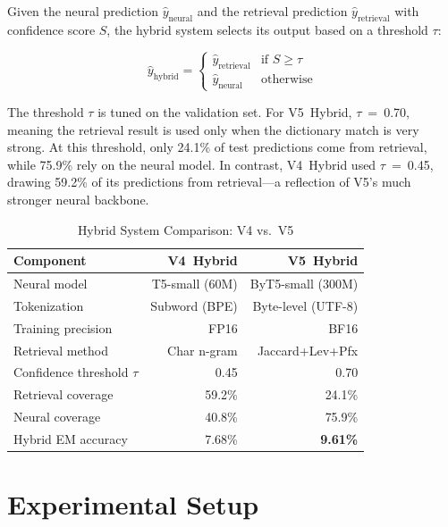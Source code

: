 \documentclass[conference]{IEEEtran}
\begin{document}
Given the neural prediction $\hat{y}_\text{neural}$ and the retrieval prediction $\hat{y}_\text{retrieval}$ with confidence score $S$, the hybrid system selects its output based on a threshold $\tau$:

\begin{equation}
\hat{y}_\text{hybrid} = \begin{cases}
\hat{y}_\text{retrieval} & \text{if } S \geq \tau \\
\hat{y}_\text{neural} & \text{otherwise}
\end{cases}
\end{equation}

The threshold $\tau$ is tuned on the validation set. For V5~Hybrid, $\tau$~=~0.70, meaning the retrieval result is used only when the dictionary match is very strong. At this threshold, only 24.1\% of test predictions come from retrieval, while 75.9\% rely on the neural model. In contrast, V4~Hybrid used $\tau$~=~0.45, drawing 59.2\% of its predictions from retrieval---a reflection of V5's much stronger neural backbone.


\begin{table}[htbp]
\centering
\caption{Hybrid System Comparison: V4 vs.\ V5}
\label{tab:hybrid}
\begin{tabular}{lrr}
\toprule
\textbf{Component} & \textbf{V4~Hybrid} & \textbf{V5~Hybrid} \\
\midrule
Neural model & T5-small (60M) & ByT5-small (300M) \\
Tokenization & Subword (BPE) & Byte-level (UTF-8) \\
Training precision & FP16 & BF16 \\
Retrieval method & Char n-gram & Jaccard+Lev+Pfx \\
Confidence threshold $\tau$ & 0.45 & 0.70 \\
Retrieval coverage & 59.2\% & 24.1\% \\
Neural coverage & 40.8\% & 75.9\% \\
\midrule
Hybrid EM accuracy & 7.68\% & \textbf{9.61\%} \\
\bottomrule
\end{tabular}
\end{table}

\section{Experimental Setup}\label{sec:experiments}
\end{document}
